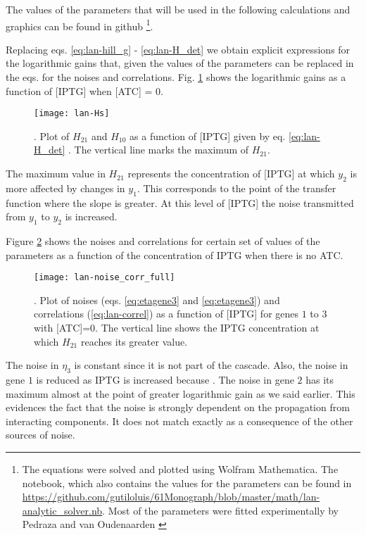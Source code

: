 The values of the parameters that will be used in the following calculations and graphics can be found in github \footnote{The equations were solved and plotted using Wolfram Mathematica. The notebook, which also contains the values for the parameters can be found in \url{https://github.com/gutiloluis/61Monograph/blob/master/math/lan-analytic_solver.nb}. Most of the parameters were fitted experimentally by Pedraza and van Oudenaarden \cite{pedraza05}}. 

Replacing eqs. \eqref{eq:lan-hill_g} - \eqref{eq:lan-H_det} we obtain explicit expressions for the logarithmic gains that, given the values of the parameters can be replaced in the eqs. for the noises and correlations. Fig. \ref{fig:lan-Hs} shows the logarithmic gains as a function of [IPTG] when [ATC] = 0.

\begin{figure}[H]
  \centering
  \texttt{[image: lan-Hs]}
  \caption[Logarithmic gains for the genes of a cascade]{\label{fig:lan-Hs}. Plot of $H_{21}$ and $H_{10}$ as a function of [IPTG] given by eq. \eqref{eq:lan-H_det} . The vertical line marks the maximum of $H_{21}$.}
\end{figure}

The maximum value in $H_{21}$ represents the concentration of [IPTG] at which $y_2$ is more affected by changes in $y_1$. This corresponds to the point of the transfer function where the slope is greater. At this level of [IPTG] the noise transmitted from $y_1$ to $y_2$ is increased.

Figure \ref{fig:lan-noise_corr_full} shows the noises and correlations for certain set of values of the parameters as a function of the concentration of IPTG when there is no ATC.

\begin{figure}[H]
  \centering
  \texttt{[image: lan-noise\_corr\_full]}
  \caption[Noises and correlation for the genes of a cascade]{\label{fig:lan-noise_corr_full}. Plot of noises (eqs. \eqref{eq:etagene3} and \eqref{eq:etagene3}) and correlations (\eqref{eq:lan-correl}) as a function of [IPTG] for genes $1$ to $3$ with [ATC]=0. The vertical line shows the IPTG concentration at which $H_{21}$ reaches its greater value.}
\end{figure}

The noise in $\eta_3$ is constant since it is not part of the cascade. Also, the noise in gene $1$ is reduced as IPTG is increased because . The noise in gene $2$ has its maximum almost at the point of greater logarithmic gain as we said earlier. This evidences the fact that the noise is strongly dependent on the propagation from interacting components. It does not match exactly as a consequence of the other sources of noise.

